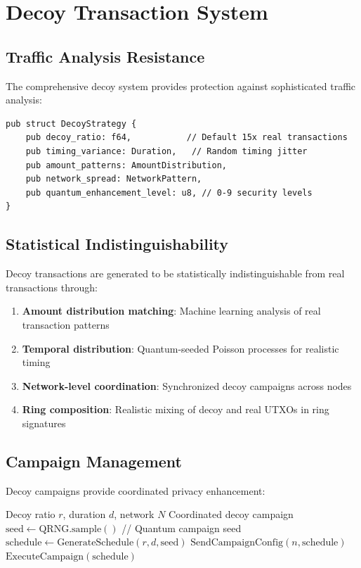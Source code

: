 \documentclass[12pt,a4paper]{article}
\begin{document}
\section{Decoy Transaction System}

\subsection{Traffic Analysis Resistance}

The comprehensive decoy system provides protection against sophisticated traffic analysis:

\begin{lstlisting}[style=rustcode, caption=Decoy Strategy Configuration]
pub struct DecoyStrategy {
    pub decoy_ratio: f64,           // Default 15x real transactions
    pub timing_variance: Duration,   // Random timing jitter
    pub amount_patterns: AmountDistribution,
    pub network_spread: NetworkPattern,
    pub quantum_enhancement_level: u8, // 0-9 security levels
}
\end{lstlisting}

\subsection{Statistical Indistinguishability}

Decoy transactions are generated to be statistically indistinguishable from real transactions through:

\begin{enumerate}
\item \textbf{Amount distribution matching}: Machine learning analysis of real transaction patterns
\item \textbf{Temporal distribution}: Quantum-seeded Poisson processes for realistic timing
\item \textbf{Network-level coordination}: Synchronized decoy campaigns across nodes
\item \textbf{Ring composition}: Realistic mixing of decoy and real UTXOs in ring signatures
\end{enumerate}

\subsection{Campaign Management}

Decoy campaigns provide coordinated privacy enhancement:

\begin{algorithm}
\caption{Decoy Campaign Coordination}
\begin{algorithmic}[1]
\REQUIRE Decoy ratio $r$, duration $d$, network $N$
\ENSURE Coordinated decoy campaign
\STATE $\text{seed} \leftarrow \text{QRNG.sample}()$ // Quantum campaign seed
\STATE $\text{schedule} \leftarrow \text{GenerateSchedule}(r, d, \text{seed})$
    \STATE $\text{SendCampaignConfig}(n, \text{schedule})$
\ENDFOR
\STATE $\text{ExecuteCampaign}(\text{schedule})$
\end{algorithmic}
\end{algorithm}
\end{document}
